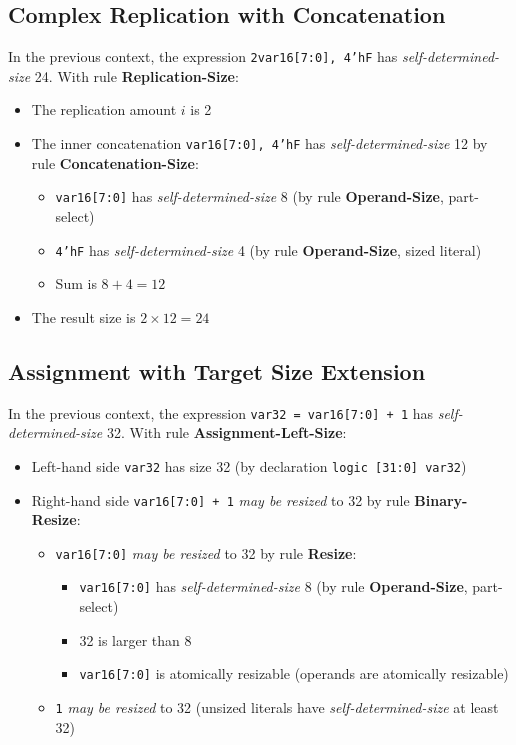 \documentclass{article}
\newcommand{\sv}[1]{\texttt{#1}}
\newcommand{\sds}{\emph{self-determined-size}}
\newcommand{\mbr}{\emph{may be resized}}
\begin{document}
\subsection{Complex Replication with Concatenation}

In the previous context, the expression \sv{{2{var16[7:0], 4'hF}}} has \sds{}
24. With rule \textbf{Replication-Size}:

\begin{itemize}
  \item The replication amount $i$ is 2
  \item The inner concatenation \sv{{var16[7:0], 4'hF}} has
    \sds{} 12 by rule \textbf{Concatenation-Size}:
    \begin{itemize}
      \item \sv{var16[7:0]} has \sds{} 8 (by rule
        \textbf{Operand-Size}, part-select)
      \item \sv{4'hF} has \sds{} 4 (by rule
        \textbf{Operand-Size}, sized literal)
      \item Sum is $8 + 4 = 12$
    \end{itemize}
  \item The result size is $2 \times 12 = 24$
\end{itemize}

\subsection{Assignment with Target Size Extension}

In the previous context, the expression \sv{var32 = var16[7:0] + 1} has
\sds{} 32. With rule \textbf{Assignment-Left-Size}:

\begin{itemize}
  \item Left-hand side \sv{var32} has size 32 (by declaration
    \sv{logic [31:0] var32})
  \item Right-hand side \sv{var16[7:0] + 1} \mbr{} to 32 by
    rule \textbf{Binary-Resize}:
    \begin{itemize}
      \item \sv{var16[7:0]} \mbr{} to 32 by rule
        \textbf{Resize}:
        \begin{itemize}
          \item \sv{var16[7:0]} has \sds{} 8
            (by rule \textbf{Operand-Size}, part-select)
          \item 32 is larger than 8
          \item \sv{var16[7:0]} is atomically resizable
            (operands are atomically resizable)
        \end{itemize}
      \item \sv{1} \mbr{} to 32 (unsized literals have
        \sds{} at least 32)
    \end{itemize}
\end{itemize}
\end{document}
